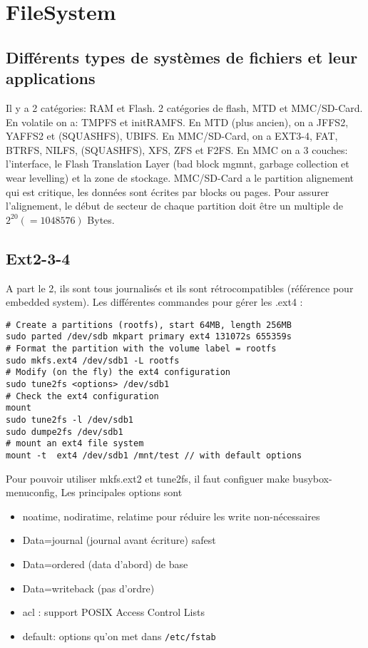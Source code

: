 \section{FileSystem}
\subsection{Différents types de systèmes de fichiers et leur applications}
Il y a 2 catégories: RAM et Flash. 2 catégories de flash, MTD et MMC/SD-Card.
En volatile on a: TMPFS et initRAMFS. En MTD (plus ancien), on a JFFS2, YAFFS2 et (SQUASHFS), UBIFS. En MMC/SD-Card, on a EXT3-4, FAT, BTRFS, NILFS, (SQUASHFS), XFS, ZFS et F2FS. En MMC on a 3 couches: l'interface, le Flash Translation Layer (bad block mgmnt, garbage collection et wear levelling) et la zone de stockage. MMC/SD-Card a le partition alignement qui est critique, les données sont écrites par blocks ou pages. Pour assurer l'alignement, le début de secteur de chaque partition doit être un multiple de $2^{20}(=1048576)$ Bytes.
\subsection{Ext2-3-4}
A part le 2, ils sont tous journalisés et ils sont rétrocompatibles (référence pour embedded system). Les différentes commandes pour gérer les .ext4 :
\begin{lstlisting}[style=bash]
# Create a partitions (rootfs), start 64MB, length 256MB
sudo parted /dev/sdb mkpart primary ext4 131072s 655359s
# Format the partition with the volume label = rootfs
sudo mkfs.ext4 /dev/sdb1 -L rootfs
# Modify (on the fly) the ext4 configuration
sudo tune2fs <options> /dev/sdb1
# Check the ext4 configuration
mount
sudo tune2fs -l /dev/sdb1
sudo dumpe2fs /dev/sdb1
# mount an ext4 file system
mount -t  ext4 /dev/sdb1 /mnt/test // with default options
\end{lstlisting}
Pour pouvoir utiliser mkfs.ext2 et tune2fs, il faut configuer make busybox-menuconfig, Les principales options sont
\begin{itemize}
\item noatime, nodiratime, relatime pour réduire les write non-nécessaires
\item Data=journal (journal avant écriture) safest
\item Data=ordered (data d'abord) de base
\item Data=writeback (pas d'ordre)
\item acl : support POSIX Access Control Lists
\item default: options qu'on met dans \verb!/etc/fstab!
\end{itemize}
